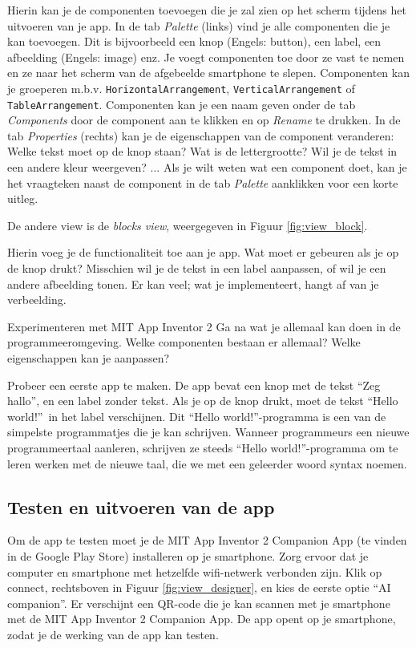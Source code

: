 Hierin kan je de componenten toevoegen die je zal zien op het scherm tijdens het uitvoeren van je app. In de tab \emph{Palette} (links) vind je alle componenten die je kan toevoegen. Dit is bijvoorbeeld een knop (Engels: button), een label, een afbeelding (Engels: image) enz. Je voegt componenten toe door ze vast te nemen en ze naar het scherm van de afgebeelde smartphone te slepen. Componenten kan je groeperen m.b.v. \texttt{HorizontalArrangement}, \texttt{VerticalArrangement} of \texttt{TableArrangement}. Componenten kan je een naam geven onder de tab \emph{Components} door de component aan te klikken en op \emph{Rename} te drukken. In de tab \emph{Properties} (rechts) kan je de eigenschappen van de component veranderen: Welke tekst moet op de knop staan? Wat is de lettergrootte? Wil je de tekst in een andere kleur weergeven? ... Als je wilt weten wat een component doet, kan je het vraagteken naast de component in de tab \emph{Palette} aanklikken voor een korte uitleg.

De andere view is de \emph{blocks view}, weergegeven in Figuur \ref{fig:view_block}.


Hierin voeg je de functionaliteit toe aan je app. Wat moet er gebeuren als je op de knop drukt? Misschien wil je de tekst in een label aanpassen, of wil je een andere afbeelding tonen. Er kan veel; wat je implementeert, hangt af van je verbeelding.

\begin{opdracht}{Experimenteren met MIT App Inventor 2}
Ga na wat je allemaal kan doen in de programmeeromgeving. Welke componenten bestaan er allemaal? Welke eigenschappen kan je aanpassen?

Probeer een eerste app te maken. De app bevat een knop met de tekst \textquotedblleft Zeg hallo\textquotedblright, en een label zonder tekst. Als je op de knop drukt, moet de tekst \textquotedblleft Hello world!\textquotedblright \ in het label verschijnen. Dit \textquotedblleft Hello world!\textquotedblright-programma is een van de simpelste programmatjes die je kan schrijven. Wanneer programmeurs een nieuwe programmeertaal aanleren, schrijven ze steeds \textquotedblleft Hello world!\textquotedblright-programma om te leren werken met de nieuwe taal, die we met een geleerder woord syntax noemen.
\end{opdracht}

\subsection{Testen en uitvoeren van de app}
Om de app te testen moet je de MIT App Inventor 2 Companion App (te vinden in de Google Play Store) installeren op je smartphone. 
Zorg ervoor dat je computer en smartphone met hetzelfde wifi-netwerk verbonden zijn. 
Klik op connect, rechtsboven in Figuur \ref{fig:view_designer}, en kies de eerste optie \textquotedblleft AI companion\textquotedblright. Er verschijnt een QR-code die je kan scannen met je smartphone met de MIT App Inventor 2 Companion App. De app opent op je smartphone, zodat je de werking van de app kan testen.

